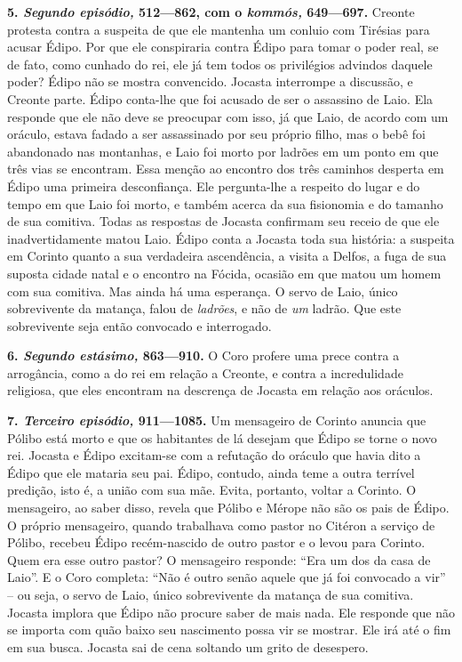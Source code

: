 \textbf{5. \emph{Segundo episódio,} 512---862, com o \emph{kommós,} 649---697.} 
Creonte protesta contra a suspeita de que ele mantenha um
conluio com Tirésias para acusar Édipo. Por que ele conspiraria contra
Édipo para tomar o poder real, se de fato, como cunhado do rei, ele já
tem todos os privilégios advindos daquele poder? Édipo não se mostra
convencido. Jocasta interrompe a discussão, e Creonte parte. Édipo
conta-lhe que foi acusado de ser o assassino de Laio. Ela responde que
ele não deve se preocupar com isso, já que Laio, de acordo com um
oráculo, estava fadado a ser assassinado por seu próprio filho, mas o
bebê foi abandonado nas montanhas, e Laio foi morto por ladrões em um
ponto em que três vias se encontram. Essa menção ao encontro dos três
caminhos desperta em Édipo uma primeira desconfiança. Ele pergunta-lhe a
respeito do lugar e do tempo em que Laio foi morto, e também acerca da
sua fisionomia e do tamanho de sua comitiva. Todas as respostas de
Jocasta confirmam seu receio de que ele inadvertidamente matou Laio.
Édipo conta a Jocasta toda sua história: a suspeita em Corinto quanto a
sua verdadeira ascendência, a visita a Delfos, a fuga de sua suposta
cidade natal e o encontro na Fócida, ocasião em que matou um homem com
sua comitiva. Mas ainda há uma esperança. O servo de Laio, único
sobrevivente da matança, falou de \emph{ladrões}, e não de \emph{um}
ladrão. Que este sobrevivente seja então convocado e interrogado.

\textbf{6. \emph{Segundo estásimo,} 863---910.} O Coro profere uma prece
contra a arrogância, como a do rei em relação a Creonte, e contra a
incredulidade religiosa, que eles encontram na descrença de Jocasta em
relação aos oráculos.

\textbf{7. \emph{Terceiro episódio,} 911---1085.} Um mensageiro de
Corinto anuncia que Pólibo está morto e que os habitantes de lá desejam
que Édipo se torne o novo rei. Jocasta e Édipo excitam-se com a
refutação do oráculo que havia dito a Édipo que ele mataria seu pai.
Édipo, contudo, ainda teme a outra terrível predição, isto é, a união
com sua mãe. Evita, portanto, voltar a Corinto. O mensageiro, ao saber
disso, revela que Pólibo e Mérope não são os pais de Édipo. O próprio
mensageiro, quando trabalhava como pastor no Citéron a serviço de
Pólibo, recebeu Édipo recém-nascido de outro pastor e o levou para
Corinto. Quem era esse outro pastor? O mensageiro responde: ``Era um dos
da casa de Laio''. E o Coro completa: ``Não é outro senão aquele que já
foi convocado a vir'' -- ou seja, o servo de Laio, único sobrevivente da
matança de sua comitiva. Jocasta implora que Édipo não procure saber de
mais nada. Ele responde que não se importa com quão baixo seu nascimento
possa vir se mostrar. Ele irá até o fim em sua busca. Jocasta sai de
cena soltando um grito de desespero.

